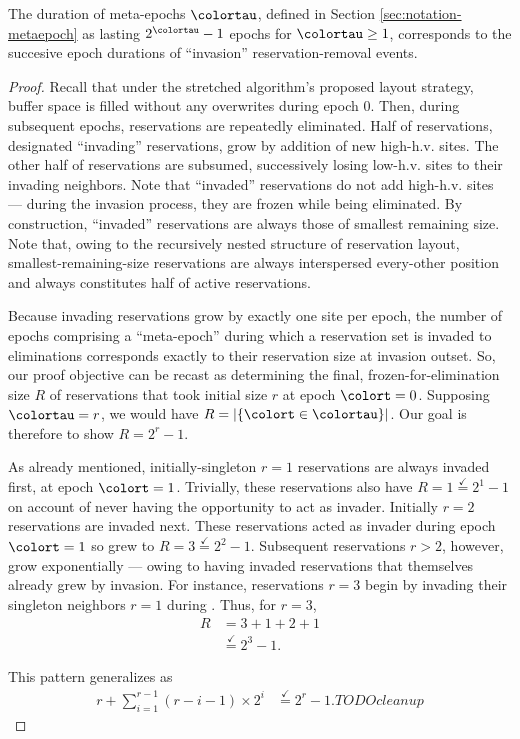 \begin{lemma}
\label{thm:stretched-meta-epoch}

The duration of meta-epochs $\colortau$, defined in Section \ref{sec:notation-metaepoch} as lasting $2^{\colortau} - 1$ epochs for $\colortau\geq1$, corresponds to the succesive epoch durations of ``invasion'' reservation-removal events.
\end{lemma}

\begin{proof}

Recall that under the stretched algorithm's proposed layout strategy, buffer space is filled without any overwrites during epoch 0.
Then, during subsequent epochs, reservations are repeatedly eliminated.
Half of reservations, designated ``invading'' reservations, grow by addition of new high-h.v. sites.
The other half of reservations are subsumed, successively losing low-h.v. sites to their invading neighbors.
Note that ``invaded'' reservations do not add high-h.v. sites --- during the invasion process, they are frozen while being eliminated.
By construction, ``invaded'' reservations are always those of smallest remaining size.
Note that, owing to the recursively nested structure of reservation layout, smallest-remaining-size reservations are always interspersed every-other position and always constitutes half of active reservations.

Because invading reservations grow by exactly one site per epoch, the number of epochs comprising a ``meta-epoch'' during which a reservation set is invaded to eliminations corresponds exactly to their reservation size at invasion outset.
So, our proof objective can be recast as determining the final, frozen-for-elimination size $R$ of reservations that took initial size $r$ at epoch $\colort=0$.
Supposing $\colortau = r$, we would have $R = |\{\colort \in \colortau\}|$.
Our goal is therefore to show $R = 2^{r} - 1$.

As already mentioned, initially-singleton $r=1$ reservations are always invaded first, at epoch $\colort=1$.
Trivially, these reservations also have $R = 1 \stackrel{\checkmark}{=} 2^1 - 1$ on account of never having the opportunity to act as invader.
Initially $r=2$ reservations are invaded next.
These reservations acted as invader during epoch $\colort=1$ so grew to $R = 3 \stackrel{\checkmark}{=} 2^2 - 1$.
Subsequent reservations $r>2$, however, grow exponentially --- owing to having invaded reservations that themselves already grew by invasion.
For instance, reservations $r=3$ begin by invading their singleton neighbors $r=1$ during .
Thus, for $r=3$,
\begin{align*}
R
&= 3 + 1 + 2 + 1\\
&\stackrel{\checkmark}{=} 2^3 - 1.
\end{align*}

This pattern generalizes as
\begin{align*}
r + \sum_{i=1}^{r-1} (r - i - 1) \times 2^{i}
&\stackrel{\checkmark}{=} 2^{r} - 1. TODO cleanup
\end{align*}

\end{proof}

